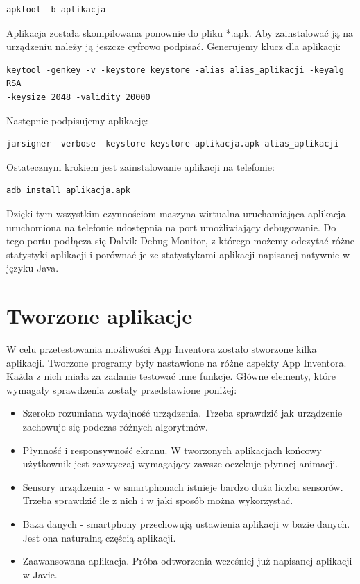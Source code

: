 \begin{lstlisting}
apktool -b aplikacja
\end{lstlisting}

Aplikacja została skompilowana ponownie do pliku *.apk. Aby zainstalować ją na urządzeniu należy ją jeszcze cyfrowo podpisać. Generujemy klucz dla aplikacji:

\begin{lstlisting}
keytool -genkey -v -keystore keystore -alias alias_aplikacji -keyalg RSA 
-keysize 2048 -validity 20000
\end{lstlisting}

Następnie podpisujemy aplikację:

\begin{lstlisting}
jarsigner -verbose -keystore keystore aplikacja.apk alias_aplikacji
\end{lstlisting}

Ostatecznym krokiem jest zainstalowanie aplikacji na telefonie:

\begin{lstlisting}
adb install aplikacja.apk
\end{lstlisting}

Dzięki tym wszystkim czynnościom maszyna wirtualna uruchamiająca aplikacja uruchomiona na telefonie udostępnia na port umożliwiający debugowanie. Do tego portu podłącza się Dalvik Debug Monitor, z którego możemy odczytać różne statystyki aplikacji i porównać je ze statystykami aplikacji napisanej natywnie w języku Java.


\section{Tworzone aplikacje}

W celu przetestowania możliwości App Inventora zostało stworzone kilka aplikacji. Tworzone programy były nastawione na różne aspekty App Inventora. Każda z nich miała za zadanie testować inne funkcje. Główne elementy, które wymagały sprawdzenia zostały przedstawione poniżej:

\begin{itemize}
\item Szeroko rozumiana wydajność urządzenia. Trzeba sprawdzić jak urządzenie zachowuje się podczas różnych algorytmów. 
\item Płynność i responsywność ekranu. W tworzonych aplikacjach końcowy użytkownik jest zazwyczaj wymagający zawsze oczekuje płynnej animacji.
\item Sensory urządzenia - w smartphonach istnieje bardzo duża liczba sensorów. Trzeba sprawdzić ile z nich i w jaki sposób można wykorzystać.
\item Baza danych - smartphony przechowują ustawienia aplikacji w bazie danych. Jest ona naturalną częścią aplikacji.
\item Zaawansowana aplikacja. Próba odtworzenia wcześniej już napisanej aplikacji w Javie. 
\end{itemize}
